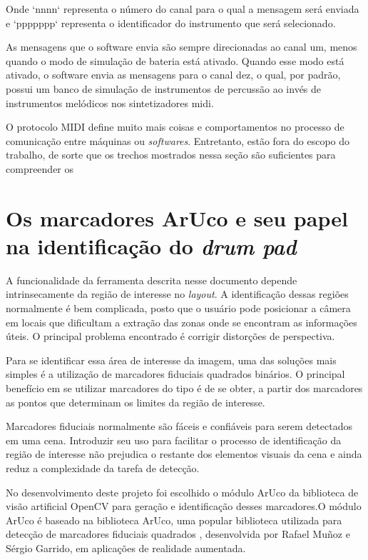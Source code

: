 \documentclass[12pt]{report}
\begin{document}
Onde `nnnn` representa o número do canal para o qual a mensagem será
enviada e `ppppppp` representa o identificador do instrumento que será
selecionado.

As mensagens que o software envia são sempre direcionadas ao canal um,
menos quando o modo de simulação de bateria está ativado. Quando esse
modo está ativado, o software envia as mensagens para o canal dez, o
qual, por padrão, possui um banco de simulação de instrumentos de
percussão ao invés de instrumentos melódicos nos sintetizadores midi.

O protocolo MIDI define muito mais coisas e comportamentos no processo
de comunicação entre máquinas ou {\it softwares}. Entretanto, estão
fora do escopo do trabalho, de sorte que os trechos mostrados nessa
seção são suficientes para compreender os 

\chapter{Os marcadores ArUco e seu papel na identificação do {\it drum
    pad}}
\label{cha:aruco}

A funcionalidade da ferramenta descrita nesse documento depende
intrinsecamente da região de interesse no {\it layout}. A
identificação dessas regiões normalmente é bem complicada, posto que o
usuário pode posicionar a câmera em locais que dificultam a extração
das zonas onde se encontram as informações úteis. O principal problema
encontrado é corrigir distorções de perspectiva. 

Para se identificar essa área de interesse da imagem, uma das soluções
mais simples é a utilização de marcadores fiduciais quadrados
binários. O principal benefício em se utilizar marcadores do tipo é de
se obter, a partir dos marcadores as pontos que determinam os limites
da região de interesse.

Marcadores fiduciais normalmente são fáceis e confiáveis para serem
detectados em uma cena. Introduzir seu uso para facilitar o processo
de identificação da região de interesse não prejudica o restante dos
elementos visuais da cena e ainda reduz a complexidade da tarefa de
detecção.

No desenvolvimento deste projeto foi escolhido o módulo ArUco da
biblioteca de visão artificial OpenCV para geração e identificação
desses marcadores.O módulo ArUco é baseado na biblioteca ArUco, uma
popular biblioteca utilizada para detecção de marcadores fiduciais
quadrados \cite{aruco2}, desenvolvida por Rafael Muñoz e Sérgio Garrido, em
aplicações de realidade aumentada.
\end{document}

